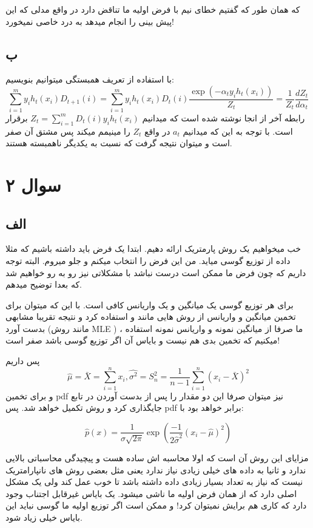 \documentclass{article}[12pt]
\begin{document}
که همان طور که گفتیم خطای نیم با فرض اولیه ما تناقض دارد در واقع مدلی که این پیش بینی را انجام میدهد به درد خاصی نمیخورد! 
\subsection{ب}

با استفاده از تعریف همبستگی میتوانیم بنویسیم:
\begin{equation*}
\sum_{i=1}^m y_i h_t(x_i) D_{t+1}(i) = 
\sum_{i=1}^m y_i h_t(x_i) D_t(i) 
\frac{
\exp(-\alpha_t y_i h_t(x_i)) }
{Z_t} = \frac{1}{Z_t} \frac{d Z_t}{d \alpha_t}
\end{equation*}
رابطه آخر از انجا نوشته شده است که میدانیم 
$Z_t = \sum_{i=1}^m D_t(i) y_i h_t(x_i)$ 
برقرار است. با توجه به این که میدانیم 
$a_t$
 در واقع 
 $Z_t$
 را مینیمم میکند پس مشتق آن صفر است و میتوان نتیجه گرفت که نسبت به یکدیگر ناهمبسته هستند. 
\clearpage
\section{سوال ۲}
\subsection{الف}
خب میخواهیم یک روش پارمتریک ارائه دهیم. ابتدا یک فرض باید داشته باشیم که مثلا داده از توزیع گوسی میاید. من این فرض را انتخاب میکنم و جلو میروم. البته توجه داریم که چون فرض ما ممکن است درست نباشد با مشکلاتی نیز رو به رو خواهیم شد که بعدا توضیح میدهم. 

برای هر توزیع گوسی یک میانگین و یک واریانس کافی است. با این که میتوان برای تخمین میانگین و واریانس از روش هایی مانند
و 
استفاده کرد و نتیجه تقریبا مشابهی بدست آورد (مانند روش MLE
)
،
ما صرفا از میانگین نمونه و واریانس نمونه استفاده میکنیم که تخمین بدی هم نیست و بایاس آن اگر توزیع گوسی باشد صفر است! 

پس داریم
\begin{equation*}
\hat{\mu}=\bar{X} = \sum_{i=1}^{n} x_i, 
\hat{\sigma^2} = S_n^2 = \frac{1}{n-1} \sum_{i=1}^{n} (x_i-\bar{X})^2
\end{equation*}
و برای تخمین pdf نیز میتوان صرفا این دو مقدار را پس از بدست آوردن در تابع جایگذاری کرد و روش تکمیل خواهد شد. 
پس pdf برابر خواهد بود با:

\begin{equation*}
\hat{p}(x) = \frac{1}{\sigma \sqrt{2\pi}} 
\exp(\frac{-1}{2 \hat{\sigma}^2} (x_i-\hat{\mu})^2)
\end{equation*}

مزایای این روش آن است که اولا محاسبه اش ساده هست و پیچیدگی محاسباتی بالایی ندارد و ثانیا به داده های خیلی زیادی نیاز ندارد یعنی مثل بعضی روش های نانپارامتریک نیست که نیاز به تعداد بسیار زیادی داده داشته باشد تا خوب عمل کند ولی یک مشکل اصلی دارد که از همان فرض اولیه ما ناشی میشود. یک بایاس غیرقابل اجتناب وجود دارد که کاری هم برایش نمیتوان کرد! و ممکن است اگر توزیع اولیه ما گوسی نباید این بایاس خیلی زیاد شود. 
\clearpage
\end{document}
